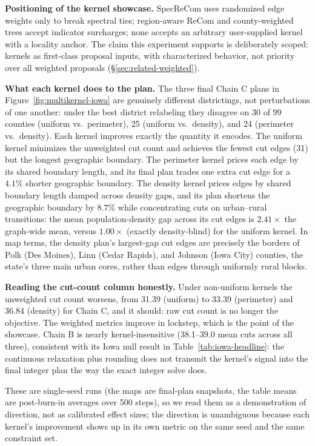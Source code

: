 \documentclass[11pt]{article}
\begin{document}
\textbf{Positioning of the kernel showcase.} SpecReCom uses randomized
edge weights only to break spectral ties; region-aware ReCom and
county-weighted trees accept indicator surcharges; none accepts an
arbitrary user-supplied kernel with a locality anchor. The claim this
experiment supports is deliberately scoped: kernels as first-class
proposal inputs, with characterized behavior, not priority over
all weighted proposals (\S\ref{sec:related-weighted}).

\textbf{What each kernel does to the plan.} The three final Chain C
plans in Figure~\ref{fig:multikernel-iowa} are genuinely different
districtings, not perturbations of one another: under the best
district relabeling they disagree on 30 of 99 counties (uniform vs.\
perimeter), 25 (uniform vs.\ density), and 24 (perimeter vs.\
density). Each kernel improves exactly the quantity it encodes. The
uniform kernel minimizes the unweighted cut count and achieves the
fewest cut edges (31) but the longest geographic boundary. The
perimeter kernel prices each edge by its shared boundary length, and
its final plan trades one extra cut edge for a $4.1\%$ shorter
geographic boundary. The density kernel prices edges by shared
boundary length damped across density gaps, and its plan shortens the
geographic boundary by $8.7\%$ while concentrating cuts on
urban--rural transitions: the mean population-density gap across its
cut edges is $2.41\times$ the graph-wide mean, versus $1.00\times$
(exactly density-blind) for the uniform kernel. In map terms, the
density plan's largest-gap cut edges are precisely the borders of
Polk (Des Moines), Linn (Cedar Rapids), and Johnson (Iowa City)
counties, the state's three main urban cores, rather than edges
through uniformly rural blocks.

\textbf{Reading the cut-count column honestly.} Under non-uniform
kernels the unweighted cut count worsens, from 31.39 (uniform) to
33.39 (perimeter) and 36.84 (density) for Chain C, and it should:
raw cut count is no longer the objective. The weighted metrics
improve in lockstep, which is the point of the showcase. Chain B is
nearly kernel-insensitive (38.1--39.0 mean cuts across all three),
consistent with its Iowa null result in
Table~\ref{tab:iowa-headline}: the continuous relaxation plus
rounding does not transmit the kernel's signal into the final integer
plan the way the exact integer solve does.

These are single-seed runs (the maps are final-plan snapshots, the
table means are post-burn-in averages over 500 steps), so we read
them as a demonstration of direction, not as calibrated effect sizes;
the direction is unambiguous because each kernel's improvement shows
up in its own metric on the same seed and the same constraint set.
\end{document}
